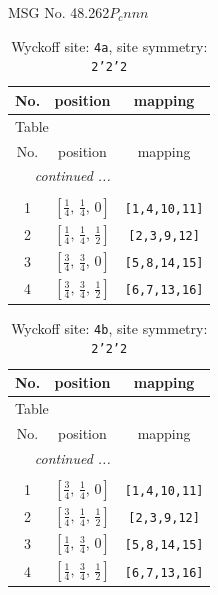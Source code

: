 \documentclass[fleqn,8pt]{jsarticle}
\begin{document}
\setcounter{MaxMatrixCols}{32}

\renewcommand{\tablename}{Table~}
\renewcommand{\figurename}{Figure~}
\begin{center}
\LARGE
MSG No. 48.262\quad$P_{c}nnn$
\end{center}
\renewcommand{\arraystretch}{1.2}
\begin{longtable}{ccc}
\caption{Wyckoff site: {\tt 4a}, site symmetry: {\tt 2'2'2}}
 \\
 \hline \hline
No. & position & mapping \\ \hline \endfirsthead

\multicolumn{2}{l}{\tablename\ \thetable{}} \\
 \hline \hline
No. & position & mapping \\ \hline \endhead

 \hline \hline
\multicolumn{2}{r}{\footnotesize\it continued ...} \\ \endfoot

 \hline \hline
\multicolumn{2}{r}{} \\ \endlastfoot

1 & $\left[ \frac{1}{4},\, \frac{1}{4},\, 0 \right]$ & {\tt [1,4,10,11]} \\ \hline
2 & $\left[ \frac{1}{4},\, \frac{1}{4},\, \frac{1}{2} \right]$ & {\tt [2,3,9,12]} \\ \hline
3 & $\left[ \frac{3}{4},\, \frac{3}{4},\, 0 \right]$ & {\tt [5,8,14,15]} \\ \hline
4 & $\left[ \frac{3}{4},\, \frac{3}{4},\, \frac{1}{2} \right]$ & {\tt [6,7,13,16]} \\
\end{longtable}
\renewcommand{\arraystretch}{1.2}
\begin{longtable}{ccc}
\caption{Wyckoff site: {\tt 4b}, site symmetry: {\tt 2'2'2}}
 \\
 \hline \hline
No. & position & mapping \\ \hline \endfirsthead

\multicolumn{2}{l}{\tablename\ \thetable{}} \\
 \hline \hline
No. & position & mapping \\ \hline \endhead

 \hline \hline
\multicolumn{2}{r}{\footnotesize\it continued ...} \\ \endfoot

 \hline \hline
\multicolumn{2}{r}{} \\ \endlastfoot

1 & $\left[ \frac{3}{4},\, \frac{1}{4},\, 0 \right]$ & {\tt [1,4,10,11]} \\ \hline
2 & $\left[ \frac{3}{4},\, \frac{1}{4},\, \frac{1}{2} \right]$ & {\tt [2,3,9,12]} \\ \hline
3 & $\left[ \frac{1}{4},\, \frac{3}{4},\, 0 \right]$ & {\tt [5,8,14,15]} \\ \hline
4 & $\left[ \frac{1}{4},\, \frac{3}{4},\, \frac{1}{2} \right]$ & {\tt [6,7,13,16]} \\
\end{longtable}
\end{document}
